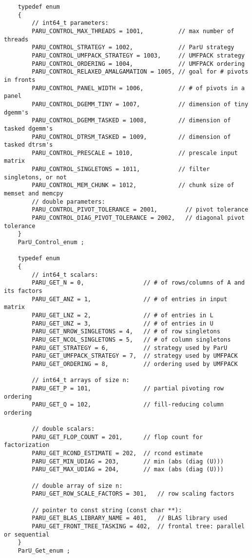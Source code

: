 \documentclass[12pt]{article}
\begin{document}
    {\footnotesize
    \begin{verbatim}
    typedef enum
    {
        // int64_t parameters:
        PARU_CONTROL_MAX_THREADS = 1001,          // max number of threads
        PARU_CONTROL_STRATEGY = 1002,             // ParU strategy
        PARU_CONTROL_UMFPACK_STRATEGY = 1003,     // UMFPACK strategy
        PARU_CONTROL_ORDERING = 1004,             // UMFPACK ordering
        PARU_CONTROL_RELAXED_AMALGAMATION = 1005, // goal for # pivots in fronts
        PARU_CONTROL_PANEL_WIDTH = 1006,          // # of pivots in a panel
        PARU_CONTROL_DGEMM_TINY = 1007,           // dimension of tiny dgemm's
        PARU_CONTROL_DGEMM_TASKED = 1008,         // dimension of tasked dgemm's
        PARU_CONTROL_DTRSM_TASKED = 1009,         // dimension of tasked dtrsm's
        PARU_CONTROL_PRESCALE = 1010,             // prescale input matrix
        PARU_CONTROL_SINGLETONS = 1011,           // filter singletons, or not
        PARU_CONTROL_MEM_CHUNK = 1012,            // chunk size of memset and memcpy
        // double parameters:
        PARU_CONTROL_PIVOT_TOLERANCE = 2001,        // pivot tolerance
        PARU_CONTROL_DIAG_PIVOT_TOLERANCE = 2002,   // diagonal pivot tolerance
    }
    ParU_Control_enum ;

    typedef enum
    {
        // int64_t scalars:
        PARU_GET_N = 0,                 // # of rows/columns of A and its factors
        PARU_GET_ANZ = 1,               // # of entries in input matrix
        PARU_GET_LNZ = 2,               // # of entries in L
        PARU_GET_UNZ = 3,               // # of entries in U
        PARU_GET_NROW_SINGLETONS = 4,   // # of row singletons
        PARU_GET_NCOL_SINGLETONS = 5,   // # of column singletons
        PARU_GET_STRATEGY = 6,          // strategy used by ParU
        PARU_GET_UMFPACK_STRATEGY = 7,  // strategy used by UMFPACK
        PARU_GET_ORDERING = 8,          // ordering used by UMFPACK

        // int64_t arrays of size n:
        PARU_GET_P = 101,               // partial pivoting row ordering
        PARU_GET_Q = 102,               // fill-reducing column ordering

        // double scalars:
        PARU_GET_FLOP_COUNT = 201,      // flop count for factorization
        PARU_GET_RCOND_ESTIMATE = 202,  // rcond estimate
        PARU_GET_MIN_UDIAG = 203,       // min (abs (diag (U)))
        PARU_GET_MAX_UDIAG = 204,       // max (abs (diag (U)))

        // double array of size n:
        PARU_GET_ROW_SCALE_FACTORS = 301,   // row scaling factors

        // pointer to const string (const char **):
        PARU_GET_BLAS_LIBRARY_NAME = 401,   // BLAS library used
        PARU_GET_FRONT_TREE_TASKING = 402,  // frontal tree: parallel or sequential
    }
    ParU_Get_enum ; \end{verbatim}}
\end{document}
